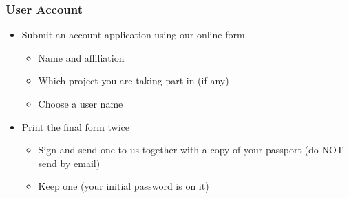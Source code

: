 \begin{frame}
	\frametitle{User Account}

	\begin{itemize}
		\item	Submit an account application using our online form
			\begin{itemize}
				\item	Name and affiliation
				\item	Which project you are taking part in (if any)
				\item	Choose a user name
			\end{itemize}
		\item	Print the final form twice
			\begin{itemize}
				\item	Sign and send one to us together with a copy of
						your passport (do NOT send by email)
				\item	Keep one (your initial password is on it)
			\end{itemize}

	\end{itemize}

\end{frame}

